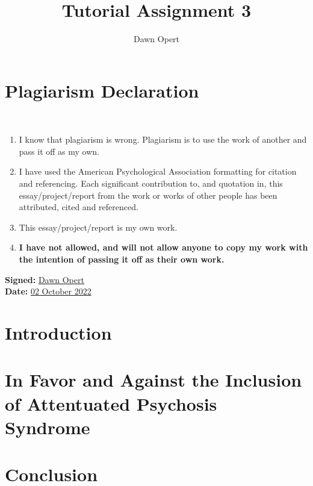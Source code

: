 \documentclass[stu,a4paper,12pt,donotrepeattitle]{apa7}
\title{Tutorial Assignment 3}
\author{Dawn Opert}
\affiliation{OPRNET001}
\begin{document}
\maketitle
\section{Plagiarism Declaration}
\\[1in]
\begin{enumerate}
    \item I know that plagiarism is wrong. Plagiarism is to use the work of
        another and pass it off as my own.
    \item I have used the American Psychological Association formatting for
        citation and referencing. Each significant contribution to, and
        quotation in, this essay/project/report from the work or works of other
        people has been attributed, cited and referenced.
    \item This essay/project/report is my own work.
    \item \textbf{I have not allowed, and will not allow anyone to copy my work
        with the intention of passing it off as their own work.}
\end{enumerate}

\textbf{Signed:} \underline{Dawn Opert}\\
\textbf{Date:} \underline{02 October 2022}
\newpage
\nocite{*}
\section{Introduction}
\section{In Favor and Against the Inclusion of Attentuated Psychosis Syndrome}
\section{Conclusion}
\newpage
\printbibliography
\end{document}
